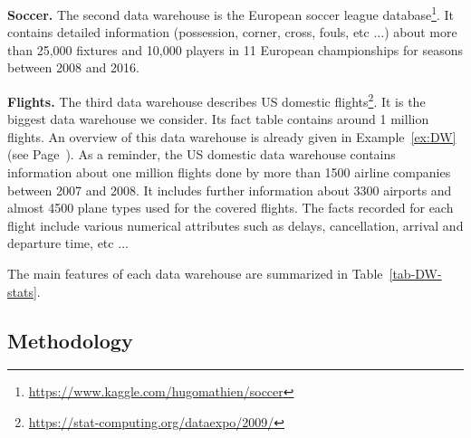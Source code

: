 \noindent \textbf{Soccer. }
The second data warehouse is the European soccer league database\footnote{\url{https://www.kaggle.com/hugomathien/soccer}}. It contains detailed information (possession, corner, cross, fouls, etc $\ldots$) about more than 25,000 fixtures and 10,000 players in 11 European championships for seasons between 2008 and 2016.


\noindent \textbf{Flights. }The third data warehouse describes US domestic flights\footnote{\url{https://stat-computing.org/dataexpo/2009/}}. It is the biggest data warehouse we consider. Its fact table contains around 1 million flights. An overview of this data warehouse is already given in Example~\ref{ex:DW} (see Page~\pageref{ex:DW}). As a reminder, the US domestic data warehouse contains information about one million flights done by more than 1500 airline companies between 2007 and 2008. It includes further information about 3300 airports and almost 4500 plane types used for the covered flights. The facts recorded for each flight include various numerical attributes such as delays, cancellation, arrival and departure time, etc $\ldots$


The main features of each data warehouse are summarized in Table~\ref{tab-DW-stats}.

   \begin{table}[b]
 \centering \scriptsize
{}
 \caption{Information about data warehouses available in EVLIN}
 \label{tab-DW-stats}
 \end{table}







\subsection{Methodology}

